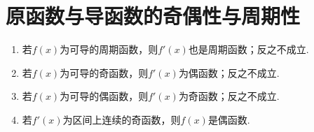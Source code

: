 \section{原函数与导函数的奇偶性与周期性}

\begin{proposition}
	\begin{enumerate}
		\item 若$f(x)$为可导的周期函数，则$f'(x)$也是周期函数；反之不成立.
		\item 若$f(x)$为可导的奇函数，则$f'(x)$为偶函数；反之不成立.
		\item 若$f(x)$为可导的偶函数，则$f'(x)$为奇函数；反之不成立.
		\item 若$f'(x)$为区间上连续的奇函数，则$f(x)$是偶函数.
	\end{enumerate}
\end{proposition}
